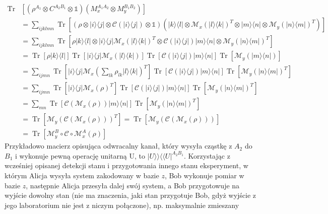 \documentclass[10pt]{article} %
\DeclareMathOperator{\Trs}{Tr}
\newcommand{\Ket}[1]{|#1\rangle}
\newcommand{\Bra}[1]{\langle#1|}
\newcommand{\BBra}[1]{\langle\langle#1|}
\newcommand{\KKet}[1]{|#1\rangle\rangle}
\newcommand{\I}{\mathbb{1}}
\begin{document}
\begin{equation}
\begin{split}
\Trs&\left[ \left(\rho^{A_1} \otimes C^{A_2B_1} \otimes \I \right)\left(M_x^{A_1A_2}\otimes M_y^{B_1B_2}\right)\right] \\
&= \sum_{ijklmn} \Trs \left[ \left(\rho \otimes \Ket{i}\Bra{j} \otimes \mathcal{C}(\Ket{i}\Bra{j}) \otimes \I\right)\left(\Ket{k}\Bra{l} \otimes \mathcal{M}_x(\Ket{l}\Bra{k})^T \otimes \Ket{m}\Bra{n} \otimes \mathcal{M}_y(\Ket{n}\Bra{m})^T\right)\right] \\
&= \sum_{ijklmn} \Trs \left[ \rho \Ket{k}\Bra{l} \otimes \Ket{i}\Bra{j}\mathcal{M}_x(\Ket{l}\Bra{k})^T \otimes \mathcal{C}(\Ket{i}\Bra{j})\Ket{m}\Bra{n} \otimes \mathcal{M}_y(\Ket{n}\Bra{m})^T\right] \\
&= \Trs\left[\rho\Ket{k}\Bra{l}\right] \Trs\left[\Ket{i}\Bra{j}\mathcal{M}_x(\Ket{l}\Bra{k})\right] \Trs\left[\mathcal{C}(\Ket{i}\Bra{j}) \Ket{m}\Bra{n}\right] \Trs\left[\mathcal{M}_y(\Ket{m}\Bra{n})\right] \\
&= \sum_{ijmn}  \Trs\left[\Ket{i}\Bra{j}\mathcal{M}_x(\sum_{lk} \rho_{lk} \Ket{l}\Bra{k})^T\right] \Trs\left[\mathcal{C}(\Ket{i}\Bra{j}) \Ket{m}\Bra{n}\right] \Trs\left[\mathcal{M}_y(\Ket{n}\Bra{m})^T\right] \\
&= \sum_{ijmn}  \Trs\left[\Ket{i}\Bra{j}\mathcal{M}_x(\rho)^T\right] \Trs\left[\mathcal{C}(\Ket{i}\Bra{j}) \Ket{m}\Bra{n}\right] \Trs\left[\mathcal{M}_y(\Ket{n}\Bra{m})^T\right] \\
&= \sum_{mn} \Trs \left[ \mathcal{C}(\mathcal{M}_x(\rho))\Ket{m}\Bra{n}\right]\Trs\left[\mathcal{M}_y(\Ket{n}\Bra{m})^T\right] \\
&=  \Trs\left[ \mathcal{M}_y (\mathcal{C}(\mathcal{M}_x(\rho)))^T\right] = \Trs\left[ \mathcal{M}_y (\mathcal{C}(\mathcal{M}_x(\rho)))\right] \\
&=\Trs \left[ \mathcal{M}_y^B \circ \mathcal{C} \circ \mathcal{M}_x^A(\rho)\right]
\end{split}
\end{equation}
Przykładowo macierz opisująca odwracalny kanał, który wysyła cząstkę z $A_2$ do $B_1$ i wykonuje pewną operację unitarną U, to $\KKet{U}\BBra{U}^{A_2B_1}$. Korzystając z wcześniej opisanej detekcji stanu i przygotowania innego stanu eksperyment, w którym Alicja wysyła system zakodowany w bazie $z$, Bob wykonuje pomiar w bazie $z$, następnie Alicja przesyła dalej swój system, a Bob przygotowuje na wyjście dowolny stan (nie ma znaczenia, jaki stan przygotuje Bob, gdyż wyjście z jego laboratorium nie jest z niczym połączone), np. maksymalnie zmieszany
\end{document}
